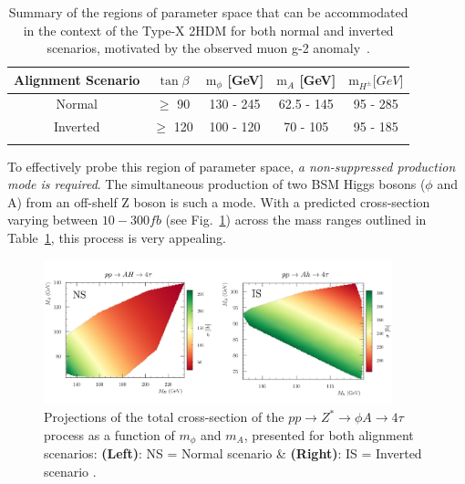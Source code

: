 \begin{table}[h]
\centering
\renewcommand{\arraystretch}{1.5} %
\setlength{\tabcolsep}{12pt} %
\begin{tabular}{|c|c|c|c|c|}
\hline
Alignment Scenario & $\tan{\beta}$ & $\text{m}_\phi$ {[}GeV{]} & $\text{m}_A$ {[}GeV{]} & $\text{m}_{H^\pm} {[}GeV{]}$ \\ \hline \hline
Normal             & $\geq$ 90     & 130 - 245                 & 62.5 - 145             & 95 - 285                     \\ \arrayrulecolor{lightgray} \hline
Inverted           & $\geq$ 120    & 100 - 120                 & 70 - 105               & 95 - 185 \\ \arrayrulecolor{black} \hline
\end{tabular}
\caption[Allowed parameter space for Type-X 2HDM scenarios accommodating the muon g-2]{Summary of the regions of parameter space that can be accommodated in the context of the Type-X 2HDM for both normal and inverted scenarios, motivated by the observed muon g-2 anomaly~\cite{TypeX_2HDM}.}
\label{Table:Chapter2_TypeX-ParameterSpace}
\end{table}

To effectively probe this region of parameter space, \textit{a non-suppressed production mode is required}. The simultaneous production of two BSM Higgs bosons ($\phi$ and A) from an off-shelf Z boson is such a mode. With a predicted cross-section varying between $10-300\unit{fb}$ (see Fig.~\ref{Figure:Chapter2_4tau_ProductionXS}) across the mass ranges outlined in Table~\ref{Table:Chapter2_TypeX-ParameterSpace}, this process is very appealing. 

\begin{figure}[h]
\centering
    \includegraphics[width= 0.9\textwidth]{Figures/Chapter2/4tau_Production_XS.pdf}
    \caption[Projections of the total cross-section of the $pp \to Z^* \to \phi A \to 4\tau$ process]{Projections of the total cross-section of the $pp \to Z^* \to \phi A \to 4\tau$ process as a function of $m_\phi$ and $m_A$, presented for both alignment scenarios: \textbf{(Left)}: NS = Normal scenario \& \textbf{(Right)}: IS = Inverted scenario \cite{TypeX_2HDM}.}
    \label{Figure:Chapter2_4tau_ProductionXS}
\end{figure}

